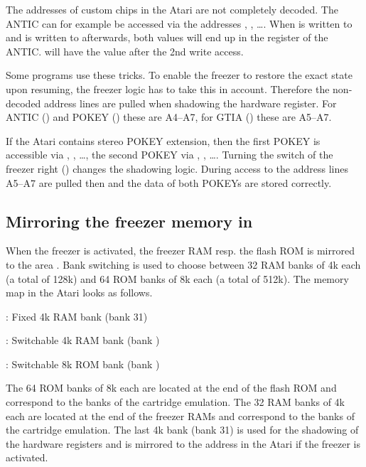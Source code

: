 The addresses of custom chips in the Atari are not completely decoded. The ANTIC
can for example be accessed via the addresses , , \dots.
When  is written to  and  is written to 
afterwards, both values will end up in the  register of the ANTIC.
 will have the value  after the 2nd write access.

Some programs use these tricks. To enable the freezer to restore the exact state
upon resuming, the freezer logic has to take this in account. Therefore the
non-decoded address lines are pulled  when shadowing the hardware
register. For ANTIC () and POKEY () these are A4--A7,
for GTIA () these are A5--A7.

If the Atari contains stereo POKEY extension, then the first POKEY is accessible
via , , \dots, the second POKEY via ,
, \dots . Turning the  switch of the freezer right ()
changes the shadowing logic. During access to  the address lines
A5--A7 are pulled  then and the data of both POKEYs are stored
correctly.

\clearpage

\subsection{Mirroring the freezer memory in}

When the freezer is activated, the freezer RAM resp. the flash ROM
is mirrored to the area . Bank switching is used to choose
between 32 RAM banks of 4k each (a total of 128k) and 64 ROM banks of 8k each
(a total of 512k). The memory map in the Atari looks as follows.

\begin{itemize*}
\item {}: Fixed 4k RAM bank (bank 31)
\item {}: Switchable 4k RAM bank (bank )
\item {}: Switchable 8k ROM bank (bank )
\end{itemize*}

The 64 ROM banks of 8k each are located at the end of the flash ROM and
correspond to the banks  of the cartridge emulation. The 32 RAM
banks of 4k each are located at the end of the freezer RAMs and correspond to
the banks  of the cartridge emulation.
The last 4k bank (bank 31) is used for the shadowing of the hardware registers
and is mirrored to the address  in the Atari if the freezer is
activated.

